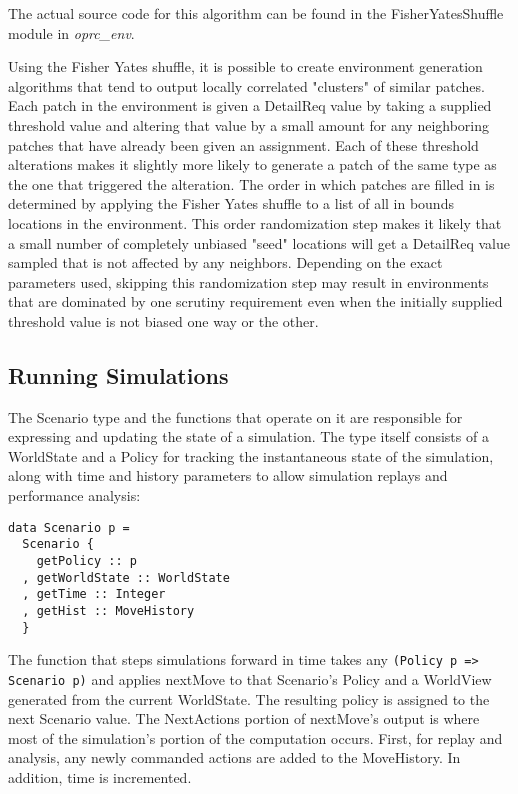 The actual source code for this algorithm can be found in the FisherYatesShuffle module in \textit{oprc\_env}.

Using the Fisher Yates shuffle, it is possible to create environment generation algorithms that tend to output locally correlated "clusters" of similar patches. Each patch in the environment is given a DetailReq value by taking a supplied threshold value and altering that value by a small amount for any neighboring patches that have already been given an assignment. Each of these threshold alterations makes it slightly more likely to generate a patch of the same type as the one that triggered the alteration. The order in which patches are filled in is determined by applying the Fisher Yates shuffle to a list of all in bounds locations in the environment. This order randomization step makes it likely that a small number of completely unbiased "seed" locations will get a DetailReq value sampled that is not affected by any neighbors. Depending on the exact parameters used, skipping this randomization step may result in environments that are dominated by one scrutiny requirement even when the initially supplied threshold value is not biased one way or the other.

\subsection{Running Simulations}

The Scenario type and the functions that operate on it are responsible for expressing and updating the state of a simulation. The type itself consists of a WorldState and a Policy for tracking the instantaneous state of the simulation, along with time and history parameters to allow simulation replays and performance analysis:

\begin{verbatim}
data Scenario p =
  Scenario {
    getPolicy :: p
  , getWorldState :: WorldState
  , getTime :: Integer
  , getHist :: MoveHistory
  }
\end{verbatim}

The function that steps simulations forward in time takes any \verb|(Policy p => Scenario p)| and applies nextMove to that Scenario's Policy and a WorldView generated from the current WorldState. The resulting policy is assigned to the next Scenario value. The NextActions portion of nextMove's output is where most of the simulation's portion of the computation occurs. First, for replay and analysis, any newly commanded actions are added to the MoveHistory. In addition, time is incremented.

